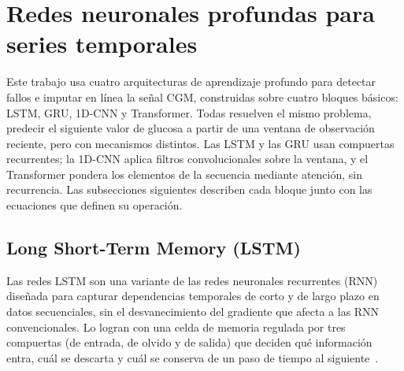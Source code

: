 \documentclass{report}
\begin{document}
\section{Redes neuronales profundas para series temporales}
\label{sec:redes_neuronales_profundas}

Este trabajo usa cuatro arquitecturas de aprendizaje profundo para detectar fallos e imputar en línea la señal CGM, construidas sobre cuatro bloques básicos: LSTM, GRU, 1D-CNN y Transformer. Todas resuelven el mismo problema, predecir el siguiente valor de glucosa a partir de una ventana de observación reciente, pero con mecanismos distintos. Las LSTM y las GRU usan compuertas recurrentes; la 1D-CNN aplica filtros convolucionales sobre la ventana, y el Transformer pondera los elementos de la secuencia mediante atención, sin recurrencia. Las subsecciones siguientes describen cada bloque junto con las ecuaciones que definen su operación.

\subsection{Long Short-Term Memory (LSTM)}
\label{subsec:lstm}

Las redes LSTM son una variante de las redes neuronales recurrentes (RNN) diseñada para capturar dependencias temporales de corto y de largo plazo en datos secuenciales, sin el desvanecimiento del gradiente que afecta a las RNN convencionales. Lo logran con una celda de memoria regulada por tres compuertas (de entrada, de olvido y de salida) que deciden qué información entra, cuál se descarta y cuál se conserva de un paso de tiempo al siguiente~\cite{siami2019performance}.
\end{document}
